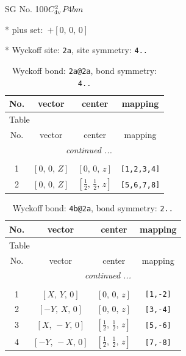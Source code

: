 \documentclass[fleqn,8pt]{jsarticle}
\begin{document}
\setcounter{MaxMatrixCols}{32}

\renewcommand{\tablename}{Table~}
\renewcommand{\figurename}{Figure~}
\begin{center}
\LARGE
SG No. 100\quad$C_{\rm 4v}^{2}$\quad$P4bm$\quad[ tetragonal ]
\end{center}

* plus set:\,\,\,$+\left[ 0,\, 0,\, 0 \right]$


* Wyckoff site: {\tt 2a}, site symmetry: {\tt 4..}
\renewcommand{\arraystretch}{1.2}
\begin{longtable}{cccc}
\caption{Wyckoff bond: {\tt 2a@2a}, bond symmetry: {\tt 4..}}
 \\
 \hline \hline
No. & vector & center & mapping \\ \hline \endfirsthead

\multicolumn{3}{l}{\tablename\ \thetable{}} \\
 \hline \hline
No. & vector & center & mapping \\ \hline \endhead

 \hline \hline
\multicolumn{3}{r}{\footnotesize\it continued ...} \\ \endfoot

 \hline \hline
\multicolumn{3}{r}{} \\ \endlastfoot

1 & $\left[ 0,\, 0,\, Z \right]$ & $\left[ 0,\, 0,\, z \right]$ & {\tt [1,2,3,4]} \\ \hline
2 & $\left[ 0,\, 0,\, Z \right]$ & $\left[ \frac{1}{2},\, \frac{1}{2},\, z \right]$ & {\tt [5,6,7,8]} \\
\end{longtable}
\renewcommand{\arraystretch}{1.2}
\begin{longtable}{cccc}
\caption{Wyckoff bond: {\tt 4b@2a}, bond symmetry: {\tt 2..}}
 \\
 \hline \hline
No. & vector & center & mapping \\ \hline \endfirsthead

\multicolumn{3}{l}{\tablename\ \thetable{}} \\
 \hline \hline
No. & vector & center & mapping \\ \hline \endhead

 \hline \hline
\multicolumn{3}{r}{\footnotesize\it continued ...} \\ \endfoot

 \hline \hline
\multicolumn{3}{r}{} \\ \endlastfoot

1 & $\left[ X,\, Y,\, 0 \right]$ & $\left[ 0,\, 0,\, z \right]$ & {\tt [1,-2]} \\ \hline
2 & $\left[ - Y,\, X,\, 0 \right]$ & $\left[ 0,\, 0,\, z \right]$ & {\tt [3,-4]} \\ \hline
3 & $\left[ X,\, - Y,\, 0 \right]$ & $\left[ \frac{1}{2},\, \frac{1}{2},\, z \right]$ & {\tt [5,-6]} \\ \hline
4 & $\left[ - Y,\, - X,\, 0 \right]$ & $\left[ \frac{1}{2},\, \frac{1}{2},\, z \right]$ & {\tt [7,-8]} \\
\end{longtable}
\end{document}
